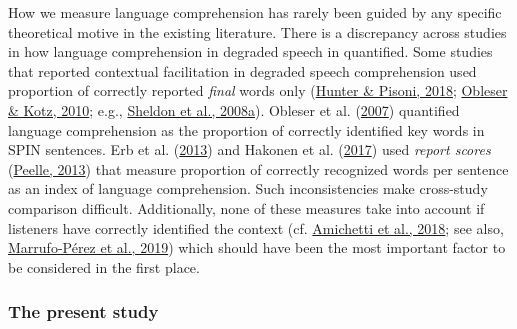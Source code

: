 \documentclass[a4paper, nobind]{templates/ociamthesis}
\begin{document}
\noindent
How we measure language comprehension has rarely been guided by any specific theoretical motive in the existing literature.
There is a discrepancy across studies in how language comprehension in degraded speech in quantified.
Some studies that reported contextual facilitation in degraded speech comprehension used proportion of correctly reported \emph{final} words only (\protect\hyperlink{ref-Hunter2018}{Hunter \& Pisoni, 2018}; \protect\hyperlink{ref-Obleser2010}{Obleser \& Kotz, 2010}; e.g., \protect\hyperlink{ref-Sheldon2008a}{Sheldon et al., 2008a}).
Obleser et al. (\protect\hyperlink{ref-Obleser2007}{2007}) quantified language comprehension as the proportion of correctly identified key words in SPIN sentences.
Erb et al. (\protect\hyperlink{ref-Erb2013}{2013}) and Hakonen et al. (\protect\hyperlink{ref-Hakonen2017}{2017}) used \emph{report scores} (\protect\hyperlink{ref-Peelle2013}{Peelle, 2013}) that measure proportion of correctly recognized words per sentence as an index of language comprehension.
Such inconsistencies make cross-study comparison difficult.
Additionally, none of these measures take into account if listeners have correctly identified the context (cf. \protect\hyperlink{ref-Amichetti2018}{Amichetti et al., 2018}; see also, \protect\hyperlink{ref-Marrufo2019}{Marrufo-Pérez et al., 2019})
which should have been the most important factor to be considered in the first place.

\hypertarget{the-present-study}{%
\subsubsection{The present study}\label{the-present-study}}
\end{document}
